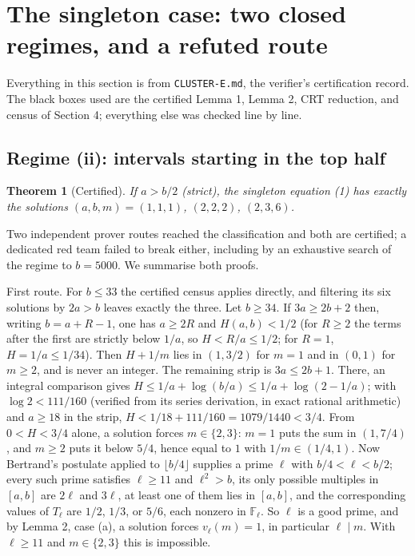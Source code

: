 \documentclass[11pt]{article}
\newtheorem{theorem}{Theorem}[section]
\theoremstyle{remark}
\begin{document}
\section{The singleton case: two closed regimes, and a refuted route}

Everything in this section is from \texttt{CLUSTER-E.md}, the verifier's certification record. The black boxes used are the certified Lemma 1, Lemma 2, CRT reduction, and census of Section 4; everything else was checked line by line.

\subsection{Regime (ii): intervals starting in the top half}

\begin{theorem}[Certified]
If $a > b/2$ (strict), the singleton equation (1) has exactly the solutions $(a,b,m) = (1,1,1)$, $(2,2,2)$, $(2,3,6)$.
\end{theorem}

Two independent prover routes reached the classification and both are certified; a dedicated red team failed to break either, including by an exhaustive search of the regime to $b = 5000$. We summarise both proofs.

First route. For $b \le 33$ the certified census applies directly, and filtering its six solutions by $2a > b$ leaves exactly the three. Let $b \ge 34$. If $3a \ge 2b + 2$ then, writing $b = a + R - 1$, one has $a \ge 2R$ and $H(a,b) < 1/2$ (for $R \ge 2$ the terms after the first are strictly below $1/a$, so $H < R/a \le 1/2$; for $R = 1$, $H = 1/a \le 1/34$). Then $H + 1/m$ lies in $(1, 3/2)$ for $m = 1$ and in $(0,1)$ for $m \ge 2$, and is never an integer. The remaining strip is $3a \le 2b + 1$. There, an integral comparison gives $H \le 1/a + \log(b/a) \le 1/a + \log(2 - 1/a)$; with $\log 2 < 111/160$ (verified from its series derivation, in exact rational arithmetic) and $a \ge 18$ in the strip, $H < 1/18 + 111/160 = 1079/1440 < 3/4$. From $0 < H < 3/4$ alone, a solution forces $m \in \{2, 3\}$: $m = 1$ puts the sum in $(1, 7/4)$, and $m \ge 2$ puts it below $5/4$, hence equal to $1$ with $1/m \in (1/4, 1)$. Now Bertrand's postulate applied to $\lfloor b/4 \rfloor$ supplies a prime $\ell$ with $b/4 < \ell < b/2$; every such prime satisfies $\ell \ge 11$ and $\ell^2 > b$, its only possible multiples in $[a,b]$ are $2\ell$ and $3\ell$, at least one of them lies in $[a,b]$, and the corresponding values of $T_\ell$ are $1/2$, $1/3$, or $5/6$, each nonzero in $\mathbb{F}_\ell$. So $\ell$ is a good prime, and by Lemma 2, case (a), a solution forces $v_\ell(m) = 1$, in particular $\ell \mid m$. With $\ell \ge 11$ and $m \in \{2,3\}$ this is impossible.
\end{document}
